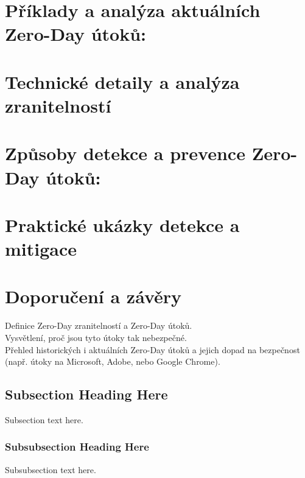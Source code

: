 \documentclass[11pt, conference, a4paper]{IEEEtran}
\begin{document}
\section{Příklady a analýza aktuálních Zero-Day útoků:}
\section{Technické detaily a analýza zranitelností}
\section{Způsoby detekce a prevence Zero-Day útoků:}
\section{Praktické ukázky detekce a mitigace}
\section{Doporučení a závěry}
% 
% 
% 
% 


Definice Zero-Day zranitelností a Zero-Day útoků.\\
Vysvětlení, proč jsou tyto útoky tak nebezpečné.\\
Přehled historických i aktuálních Zero-Day útoků a jejich dopad na bezpečnost (např. útoky na Microsoft, Adobe, nebo Google Chrome).\\


\subsection{Subsection Heading Here}
Subsection text here.


\subsubsection{Subsubsection Heading Here}
Subsubsection text here.
\end{document}
